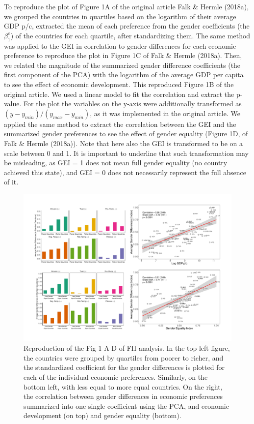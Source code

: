 \documentclass[
]{article}
\begin{document}
To reproduce the plot of Figure 1A of the original article Falk \&
Hermle (2018a), we grouped the countries in quartiles based on the
logarithm of their average GDP p/c, extracted the mean of each
preference from the gender coefficients (the \(\beta_1^c\)) of the
countries for each quartile, after standardizing them. The same method
was applied to the GEI in correlation to gender differences for each
economic preference to reproduce the plot in Figure 1C of Falk \& Hermle
(2018a). Then, we related the magnitude of the summarized gender
difference coefficients (the first component of the PCA) with the
logarithm of the average GDP per capita to see the effect of economic
development. This reproduced Figure 1B of the original article. We used
a linear model to fit the correlation and extract the p-value. For the
plot the variables on the y-axis were additionally transformed as
\((y-y_{min})/(y_{max}-y_{min})\), as it was implemented in the original
article. We applied the same method to extract the correlation between
the GEI and the summarized gender preferences to see the effect of
gender equality (Figure 1D, of Falk \& Hermle (2018a)). Note that here
also the GEI is transformed to be on a scale between 0 and 1. It is
important to underline that such transformation may be misleading, as
GEI = 1 does not mean full gender equality (no country achieved this
state), and GEI = 0 does not necessarily represent the full absence of
it.

\begin{figure}
\centering
\includegraphics{figures/replication/main_Fig1.pdf}
\caption{Reproduction of the Fig 1 A-D of FH analysis. In the top left
figure, the countries were grouped by quartiles from poorer to richer,
and the standardized coefficient for the gender differences is plotted
for each of the individual economic preferences. Similarly, on the
bottom left, with less equal to more equal countries. On the right, the
correlation between gender differences in economic preferences
summarized into one single coefficient using the PCA, and economic
development (on top) and gender equality (bottom).}
\end{figure}
\end{document}
